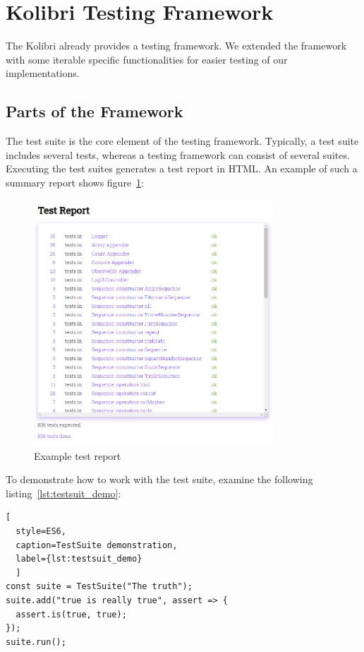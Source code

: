 \section{Kolibri Testing Framework}
\label{sec:Kolibri Test Framework}
The Kolibri already provides a testing framework. We extended the framework
with some iterable specific functionalities for easier testing of our
implementations.

\subsection{Parts of the Framework}
\label{sub:Parts of the Framework}
The test suite is the core element of the testing framework. Typically, a
test suite includes several tests, whereas a testing framework can consist of
several suites. Executing the test suites generates a test report in HTML.
An example of such a summary report shows figure~\ref{fig:test_report}:

\begin{figure}[H]
    \centering
    \includegraphics[width=0.8\textwidth]{mainmatter/pictures/test_report.png}
    \caption{Example test report}
    \label{fig:test_report}
\end{figure}


To demonstrate how to work with the test suite, examine the following
listing~\ref{lst:testsuit_demo}:

\begin{lstlisting}[
  style=ES6, 
  caption=TestSuite demonstration,
  label={lst:testsuit_demo}
  ]
const suite = TestSuite("The truth");
suite.add("true is really true", assert => {
  assert.is(true, true);
});
suite.run();
\end{lstlisting}


